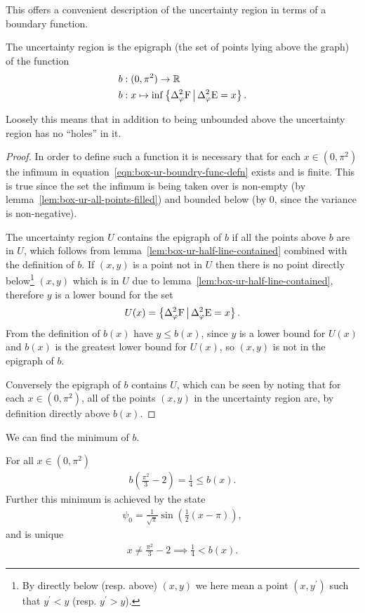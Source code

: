 This offers a convenient description of the uncertainty region in terms of a boundary function.
\begin{lem}
  The uncertainty region is the epigraph (the set of points lying above the graph) of the function
  \begin{align}
    b&:(0,\pi^2) \to \R\\
    b&:x\mapsto \inf\left\{\var[\varphi]{\opf}\,\middle|\,\var[\varphi]{\ope} = x\right\}.\label{eqn:box-ur-boundry-func-defn}
  \end{align}
\end{lem}
Loosely this means that in addition to being unbounded above the uncertainty region has no ``holes'' in it.
\begin{proof}
  In order to define such a function it is necessary that for each $x\in (0,\pi^2)$ the infimum in equation~\eqref{eqn:box-ur-boundry-func-defn} exists and is finite. This is true since the set the infimum is being taken over is non-empty (by lemma~\ref{lem:box-ur-all-points-filled}) and bounded below (by $0$, since the variance is non-negative). 

The uncertainty region $U$ contains the epigraph of $b$ if all the points above $b$ are in $U$, which follows from lemma~\ref{lem:box-ur-half-line-contained} combined with the definition of $b$. If $(x,y)$ is a point not in $U$ then there is no point directly below\footnote{By directly below (resp. above) $(x,y)$ we here mean a point $(x,y^\prime)$ such that $y^\prime < y$ (resp. $y^\prime > y$).} $(x,y)$ which is in $U$ due to lemma~\ref{lem:box-ur-half-line-contained}, therefore $y$ is a lower bound for the set
\begin{align}
  U(x) = \left\{\var[\varphi]{\opf}\,\middle|\,\var[\varphi]{\ope} = x\right\}.
\end{align}
From the definition of $b(x)$ have $y \leq b(x)$, since $y$ is a lower bound for $U(x)$ and $b(x)$ is the greatest lower bound for $U(x)$, so $(x,y)$ is not in the epigraph of $b$. 

Conversely the epigraph of $b$ contains $U$, which can be seen by noting that for each $x\in (0,\pi^2)$, all of the points $(x,y)$ in the uncertainty region are, by definition directly above $b(x)$.
\end{proof}
We can find the minimum of $b$. 
\begin{lem}
  For all $x\in (0,\pi^2)$
  \begin{align}
    b\left(\frac{\pi^2}{3} - 2\right) = \frac{1}{4} \leq b(x).
  \end{align}
  Further this minimum is achieved by the state
  \begin{align}
     \psi_0 = \frac{1}{\sqrt{\pi}}\sin\left(\frac{1}{2}(x-\pi)\right),
  \end{align}
  and is unique
  \begin{align}
    x\neq\frac{\pi^2}{3} - 2 \implies \frac{1}{4} < b(x).
  \end{align}
\end{lem}
